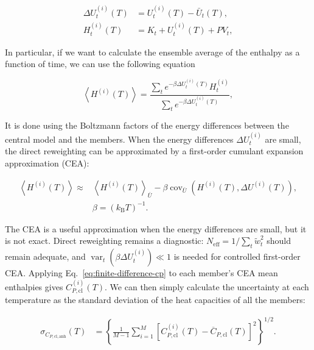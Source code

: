 \documentclass[12pt,a4paper]{article}
\numberwithin{equation}{section}
\begin{document}
\begin{align}
  \Delta U_t^{(i)}(T) &= U_t^{(i)}(T)-\bar U_t(T),\\
  H_t^{(i)}(T) &= K_t+U_t^{(i)}(T)+PV_t,
  \label{eq:llpr-frame-enthalpy}
\end{align}

In particular, if we want to calculate the ensemble average of the enthalpy as a function of time, we can use the following equation

\begin{equation}
  \left\langle H^{(i)}(T)\right\rangle
  =\frac{\sum_t e^{-\beta\Delta U_t^{(i)}(T)}H_t^{(i)}}
  {\sum_t e^{-\beta\Delta U_t^{(i)}(T)}},
  \label{eq:llpr-direct}
\end{equation}

It is done using the Boltzmann factors of the energy differences between the central model and the members.
When the energy differences $\Delta U_t^{(i)}$ are small,
the direct reweighting can be approximated by a first-order cumulant expansion approximation (CEA):

\begin{equation}
  \begin{aligned}
  \left\langle H^{(i)}(T)\right\rangle\approx{}&\left\langle H^{(i)}(T)\right\rangle_{\bar U}-\beta\operatorname{cov}_{\bar U}\left(H^{(i)}(T),\Delta U^{(i)}(T)\right),
  \\
  &\beta=(k_{\mathrm B}T)^{-1}.
  \end{aligned}
  \label{eq:llpr-cea}
\end{equation}

The CEA is a useful approximation when the energy differences are small, but it is not exact. Direct reweighting remains a diagnostic:
$N_{\mathrm{eff}}=1/\sum_t\widetilde w_t^2$ should remain adequate, and
$\operatorname{var}_t(\beta\Delta U_t^{(i)})\ll1$ is needed for controlled first-order CEA.
Applying Eq.~\eqref{eq:finite-difference-cp} to each member's CEA mean
enthalpies gives $C_{P,\mathrm{cl}}^{(i)}(T)$.
We can then simply calculate the uncertainty at each temperature as the standard deviation of the heat capacities of all the members:

\begin{equation}
  \begin{aligned}
  \sigma_{C_{P,\mathrm{cl,anh}}}(T)
  &=\left\{\frac{1}{M-1}\sum_{i=1}^{M}
  \left[C_{P,\mathrm{cl}}^{(i)}(T)
  -\overline C_{P,\mathrm{cl}}(T)\right]^2\right\}^{1/2}.
  \end{aligned}
  \label{eq:llpr-cp-spread}
\end{equation}
\end{document}
